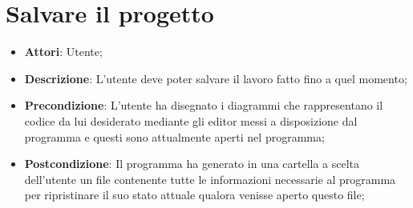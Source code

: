 \documentclass[../AnalisiDeiRequisiti.tex]{subfiles}
\begin{document}
	\section{Salvare il progetto}
	\begin{itemize}
		\item \textbf{Attori}: Utente;
		\item \textbf{Descrizione}: L'utente deve poter salvare il lavoro fatto fino a quel momento;
		\item \textbf{Precondizione}: L'utente ha disegnato i diagrammi che rappresentano il codice da lui desiderato mediante gli editor messi a disposizione dal programma e questi sono attualmente aperti nel programma;
		\item \textbf{Postcondizione}: Il programma ha generato in una cartella a scelta dell'utente un file contenente tutte le informazioni necessarie al programma per ripristinare il suo stato attuale qualora venisse aperto questo file;
	\end{itemize}		
			
\end{document}
